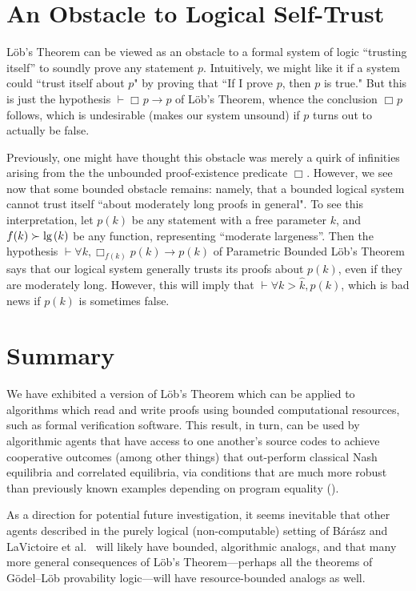\documentclass[onecolumn]{miri-tech-article}
\numberwithin{equation}{section}
\theoremstyle{definition}
\newcommand{\proves}[1]{\underset{#1}{\vdash}}
\newcommand{\bx}[1]{\Box_{#1}}
\renewcommand{\implies}{\rightarrow}
\renewcommand{\lg}{\mathrm{lg\hspace{0.3ex}}}
\renewcommand{\-}{^{-1}}
\begin{document}
\section{An Obstacle to Logical Self-Trust}
\label{sec:selftrust}
L\"{o}b's Theorem can be viewed as an obstacle to a formal system of logic ``trusting itself'' to soundly prove any statement $p$.  Intuitively, we might like it if a system could ``trust itself about $p$" by proving that ``If I prove $p$, then $p$ is true."  But this is just the hypothesis $\proves{} \bx{}p \implies p$ of L\"{o}b's Theorem, whence the conclusion $\bx{}p$ follows, which is undesirable (makes our system unsound) if $p$ turns out to actually be false.

Previously, one might have thought this obstacle was merely a quirk of infinities arising from the the unbounded proof-existence predicate $\bx{}$.  However, we see now that some bounded obstacle remains: namely, that a bounded logical system cannot trust itself ``about moderately long proofs in general".  To see this interpretation, let $p(k)$ be any statement with a free parameter $k$, and $f(k) \succ \lg(k)$ be any function, representing ``moderate largeness''.  Then the hypothesis $\proves{} \forall k, \bx{f(k)} p(k) \implies p(k)$ of Parametric Bounded L\"{o}b's Theorem says that our logical system generally trusts its proofs about $p(k)$, even if they are moderately long.  However, this will imply that $\proves{} \forall k > \hat k, p(k)$, which is bad news if $p(k)$ is sometimes false.

\section{Summary}
We have exhibited a version of L\"{o}b's Theorem which can be applied to algorithms which read and write proofs using bounded computational resources, such as formal verification software.  This result, in turn, can be used by algorithmic agents that have access to one another's source codes to achieve cooperative outcomes (among other things) that out-perform classical Nash equilibria and correlated equilibria, via conditions that are much more robust than previously known examples depending on program equality (\cite{Tennenholtz:2004:Program}).

As a direction for potential future investigation, it seems inevitable that other agents described in the purely logical (non-computable) setting of  B\'{a}r\'{a}sz and LaVictoire et al.~\cite{Barasz:2014:RobustCooperation}\cite{LaVictoire:2014:PrisDilemmaLob} will likely have bounded, algorithmic analogs, and that many more general consequences of L\"{o}b's Theorem---perhaps all the theorems of G\"{o}del--L\"{o}b provability logic---will have resource-bounded analogs as well.
\end{document}
